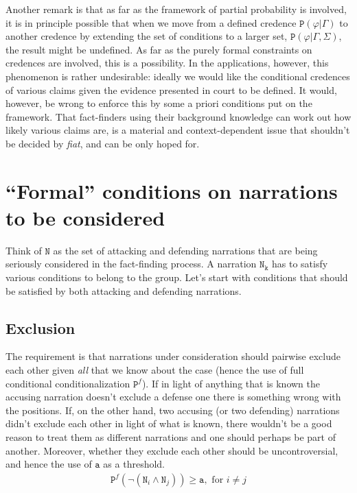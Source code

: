 \documentclass[10pt,leqno]{article}
\newcommand{\n}{\neg}
\begin{document}
Another remark is that as far as the framework of partial probability is involved, it is in principle possible that when we move from a defined credence $\mathtt{P}(\varphi\vert  \Gamma)$ to another credence by extending the set of conditions to a larger set, $\mathtt{P}(\varphi\vert \Gamma, \Sigma)$, the result might be undefined. As far as the purely formal constraints on credences are involved, this is a possibility.  In the applications, however, this phenomenon is rather undesirable: ideally we would like the conditional credences of various claims given the evidence presented in court to be defined. It would, however, be wrong to enforce this by some a priori conditions put on the framework. That  fact-finders using their background knowledge can work out how likely various claims are, is a material and context-dependent issue that shouldn't be decided by \emph{fiat}, and can be only hoped for.





\section{``Formal'' conditions on narrations to be considered}
\label{sec:formal_conditions}


Think of $\mathtt{N}$ as the set of attacking and defending narrations that are being seriously considered in the fact-finding process. A narration $\mathtt{N_k}$  has to satisfy various conditions to belong to the group. Let's start with conditions that should be satisfied by both attacking and defending narrations.  

\subsection{Exclusion}


The requirement is that  narrations under consideration should pairwise exclude each other  given \emph{all} that we know about the case (hence the use of full conditional conditionalization $\mathtt{P}^f$). If in light of anything that is known the accusing narration doesn't exclude a defense one there is something wrong with the positions. If, on the other hand, two accusing (or two defending) narrations didn't exclude each other in light of what is known, there wouldn't be a good reason to treat them as different narrations and one should perhaps be part of another. Moreover, whether they exclude each other should be uncontroversial, and hence the use of $\mathtt{a}$ as a threshold.
\begin{align}
\tag{Exclusion} \label{Exclusion} \mathtt{P}^f(\n( \mathtt{N}_i \wedge \mathtt{N}_j))\geq \mathtt{a},  \mbox{ for }  i\neq j
\end{align}
\end{document}
